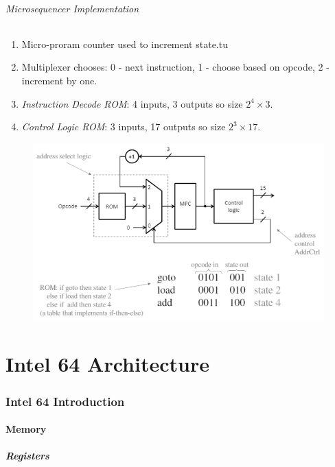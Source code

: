 \documentclass[twocolumn,english]{article}
\begin{document}
\paragraph{Microsequencer Implementation}
\begin{enumerate}
\item Micro-proram counter used to increment state.tu
\item Multiplexer chooses: 0 - next instruction, 1 - choose based on opcode,
2 - increment by one.
\item \emph{Instruction Decode ROM}: 4 inputs, 3 outputs so size $2^{4}\times3$.
\item \emph{Control Logic ROM}: 3 inputs, 17 outputs so size $2^{3}\times17$.
\end{enumerate}
\begin{figure}[H]
\noindent \centering{}\includegraphics[scale=0.375]{img/microsequencer-implementation}
\end{figure}



\part{Intel 64 Architecture}


\section{Intel 64 Introduction}


\subsection{Memory}


\subsubsection{Registers}
\end{document}
